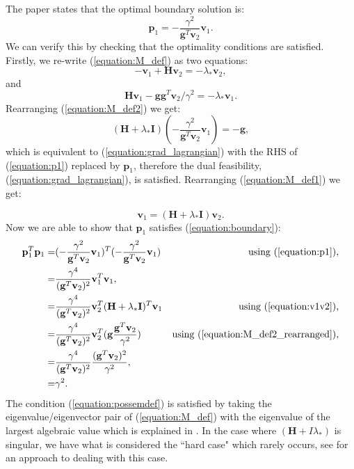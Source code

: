 \documentclass[letterpaper,12pt,titlepage,oneside,final]{book}
\begin{document}
	The paper states that the optimal boundary solution is:
	\begin{equation}
	\mathbf{p}_{1} = - \frac{\gamma^{2}}{\mathbf{g}^{T}\mathbf{v}_{2}}\mathbf{v}_{1}.
	\label{equation:p1}
	\end{equation}
	We can verify this by checking that the optimality conditions are satisfied. Firstly, we re-write (\ref{equation:M_def}) as two equations:
	\begin{equation}
	-\mathbf{v}_{1} + \mathbf{H}\mathbf{v}_{2} = -\lambda_{*}\mathbf{v}_{2},
	\label{equation:M_def1}
	\end{equation}
	and
	\begin{equation}
	\mathbf{H}\mathbf{v}_{1}-\mathbf{gg}^{T}\mathbf{v}_{2}/\gamma^{2} = -\lambda_{*}\mathbf{v}_{1}.
	\label{equation:M_def2}
	\end{equation}
	Rearranging (\ref{equation:M_def2}) we get:
	\begin{equation}
	(\mathbf{H} + \lambda_{*}\mathbf{I})(- \frac{\gamma^{2}}{\mathbf{g}^{T}\mathbf{v}_{2}}\mathbf{v}_{1}) = -\mathbf{g},
	\label{equation:M_def2_rearranged}
	\end{equation}
	which is equivalent to (\ref{equation:grad_lagrangian}) with the RHS of (\ref{equation:p1}) replaced by $\mathbf{p}_{1}$, therefore the dual feasibility, (\ref{equation:grad_lagrangian}), is satisfied. Rearranging (\ref{equation:M_def1}) we get:
	
	\begin{equation}
	\mathbf{v}_{1} = (\mathbf{H} + \lambda_{*}\mathbf{I})\mathbf{v}_{2}.
	\label{equation:v1v2}
	\end{equation}
	Now we are able to show that $\mathbf{p}_{1}$ satisfies (\ref{equation:boundary}):
	\begin{align*}
	\mathbf{p}_{1}^{T}\mathbf{p}_{1} =  & (- \frac{\gamma^{2}}{\mathbf{g}^{T}\mathbf{v}_{2}}\mathbf{v}_{1})^{T}(- \frac{\gamma^{2}}{\mathbf{g}^{T}\mathbf{v}_{2}}\mathbf{v}_{1}) & \text{using (\ref{equation:p1})},\\
	= & \frac{\gamma^{4}}{(\mathbf{g}^{T}\mathbf{v}_{2})^{2}}\mathbf{v}_{1}^{T}\mathbf{v}_{1}, \\
	= & \frac{\gamma^{4}}{(\mathbf{g}^{T}\mathbf{v}_{2})^{2}}\mathbf{v}_{2}^{T}(\mathbf{H} + \lambda_{*}\mathbf{I})^{T}\mathbf{v}_{1} & \text{using (\ref{equation:v1v2}),} \\ 
	= & \frac{\gamma^{4}}{(\mathbf{g}^{T}\mathbf{v}_{2})^{2}}\mathbf{v}_{2}^{T}(\mathbf{g}\frac{\mathbf{g}^{T}\mathbf{v}_{2}}{\gamma^{2}}) & \text{using (\ref{equation:M_def2_rearranged})},\\
	= & \frac{\gamma^{4}}{(\mathbf{g}^{T}\mathbf{v}_{2})^{2}}\frac{(\mathbf{g}^{T}\mathbf{v}_{2})^{2}}{\gamma^{2}}, \\
	= &\gamma^{2}.
	\end{align*}
	The condition (\ref{equation:possemdef}) is satisfied by taking the eigenvalue/eigenvector pair of (\ref{equation:M_def}) with the eigenvalue of the largest algebraic value which is explained in \cite{adachi.paper}. In the case where $(\mathbf{H} + I\lambda_{*})$ is singular, we have what is considered the ``hard case" which rarely occurs, see \cite{adachi.paper} for an approach to dealing with this case.  
	
\end{document}
